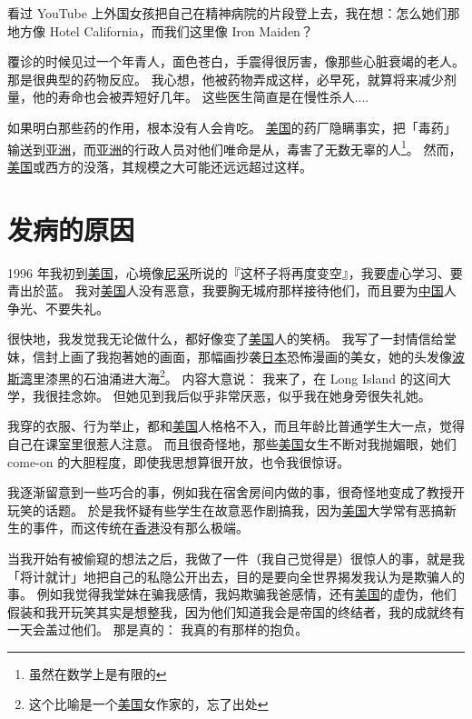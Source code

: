 \documentclass[12pt]{report}
\begin{document}
{看过 YouTube 上外国女孩把自己在精神病院的片段登上去，我在想：怎么她们那地方像 Hotel California，而我们这里像 Iron Maiden？

覆诊的时候见过一个年青人，面色苍白，手震得很厉害，像那些心脏衰竭的老人。 那是很典型的药物反应。 我心想，他被药物弄成这样，必早死，就算将来减少剂量，他的寿命也会被弄短好几年。 这些医生简直是在慢性杀人....

如果明白那些药的作用，根本没有人会肯吃。 \uline{美国}的药厂隐瞒事实，把「毒药」输送到\uline{亚洲}，而\uline{亚洲}的行政人员对他们唯命是从，毒害了无数无辜的人\footnote{虽然在数学上是有限的}。 然而，\uline{美国}或西方的没落，其规模之大可能还远远超过这样。


\chapter{发病的原因}
\label{cause-of-illness}

1996 年我初到\uline{美国}，心境像\uline{尼采}所说的『这杯子将再度变空』，我要虚心学习、要青出於蓝。 我对\uline{美国}人没有恶意，我要胸无城府那样接待他们，而且要为\uline{中国}人争光、不要失礼。

很快地，我发觉我无论做什么，都好像变了\uline{美国}人的笑柄。 我写了一封情信给堂妹，信封上画了我抱著她的画面，那幅画抄袭\uline{日本}恐怖漫画的美女，她的头发像\uline{波斯湾}里漆黑的石油涌进大海\footnote{这个比喻是一个\uline{美国}女作家的，忘了出处}。 内容大意说： 我来了，在 Long Island 的这间大学，我很挂念妳。 但她见到我后似乎非常厌恶，似乎我在她身旁很失礼她。

我穿的衣服、行为举止，都和\uline{美国}人格格不入，而且年龄比普通学生大一点，觉得自己在课室里很惹人注意。 而且很奇怪地，那些\uline{美国}女生不断对我抛媚眼，她们 come-on 的大胆程度，即使我思想算很开放，也令我很惊讶。

我逐渐留意到一些巧合的事，例如我在宿舍房间内做的事，很奇怪地变成了教授开玩笑的话题。 於是我怀疑有些学生在故意恶作剧搞我，因为\uline{美国}大学常有恶搞新生的事件，而这传统在\uline{香港}没有那么极端。

当我开始有被偷窥的想法之后，我做了一件（我自己觉得是）很惊人的事，就是我「将计就计」地把自己的私隐公开出去，目的是要向全世界揭发我认为是欺骗人的事。  例如我觉得我堂妹在骗我感情，我妈欺骗我爸感情，还有\uline{美国}的虚伪，他们假装和我开玩笑其实是想整我，因为他们知道我会是帝国的终结者，我的成就终有一天会盖过他们。 那是真的： 我真的有那样的抱负。

}
\end{document}
